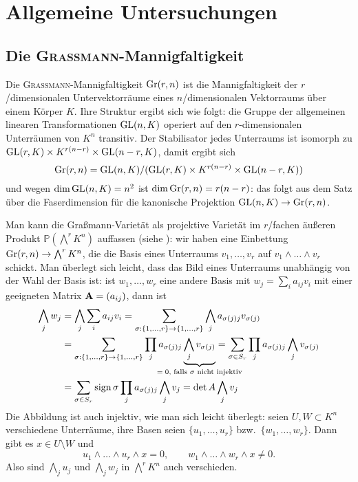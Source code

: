 \chapter{Allgemeine Untersuchungen} \label{chap:general}
\section{Die \textsc{Graßmann}-Mannigfaltigkeit} \label{sec:grassmann}
Die \textsc{Graßmann}-Mannigfaltigkeit $\grass r/n$ ist die Mannigfaltigkeit der $r$\-/dimensionalen Untervektorräume eines $n$\-/dimensionalen Vektorraums über einem Körper $K$. Ihre Struktur ergibt sich wie folgt: die Gruppe der allgemeinen linearen Transformationen $\mathrm{GL}(n,K)$ operiert auf den $r$-dimensionalen Unterräumen von $K^n$ transitiv. Der Stabilisator jedes Unterraums ist isomorph zu $\mathrm{GL}(r,K) \times K^{r(n-r)} \times \mathrm{GL}(n-r,K)$, damit ergibt sich
\begin{equation}
\grass r/n = \GL nK / (\GL rK \times K^{r(n-r)} \times \GL{n-r}K)
\end{equation}
und wegen $\dim \mathrm{GL}(n,K) = n^2$ ist $\dim \grass r/n = r(n-r)$: das folgt aus dem Satz über die Faserdimension für die kanonische Projektion $\GL nK \to \grass r/n$.

Man kann die Graßmann-Varietät als projektive Varietät im $r$\-/fachen äußeren Produkt $\mathbb P(\bigwedge^r K^n)$ auffassen (siehe \cite[S.~42]{Shafarevich}): wir haben eine Einbettung $\grass r/n \to \bigwedge^r K^n$, die die Basis eines Unterraums $v_1, \dots, v_r$ auf $v_1 \wedge
\dots \wedge v_r$ schickt. Man überlegt sich leicht, dass das Bild eines Unterraums unabhängig von der Wahl der Basis ist: ist $w_1, \dots, w_r$ eine andere Basis mit $w_j = \sum_i a_{ij} v_i$ mit einer geeigneten Matrix $\mathbf{A} = (a_{ij})$, dann ist
\begin{align*}
\bigwedge_j w_j &= \bigwedge_j \sum_i a_{ij} v_i = \sum_{\sigma: \{1,\dots,r\} \rightarrow \{1,\dots,r\}} \bigwedge_j a_{\sigma(j)j} v_{\sigma(j)} \\
	&= \sum_{\sigma: \{1,\dots,r\} \rightarrow \{1,\dots,r\}} \prod_j a_{\sigma(j)j} \wunderbrace{\bigwedge_j v_{\sigma(j)}}_{$= 0$, falls $\sigma$ nicht injektiv} = \sum_{\sigma \in S_r} \prod_j a_{\sigma(j)j} \bigwedge_j v_{\sigma(j)} \\
	&= \sum_{\sigma \in S_r} \sign \sigma \prod_j a_{\sigma(j)j} \bigwedge_j v_j = \det A \bigwedge_j v_j
\end{align*}
Die Abbildung ist auch injektiv, wie man sich leicht überlegt: seien $U, W \subset K^n$ verschiedene Unterräume, ihre Basen seien $\{u_1,\dots,u_r\}$ bzw.~$\{w_1,\dots,w_r\}$. Dann gibt es $x \in U \setminus W$ und
\begin{equation*}
u_1 \wedge \dots \wedge u_r \wedge x = 0, \qquad w_1 \wedge \dots \wedge w_r \wedge x \neq 0.
\end{equation*}
Also sind $\bigwedge_j u_j$ und $\bigwedge_j w_j$ in $\bigwedge^r K^n$ auch verschieden.

